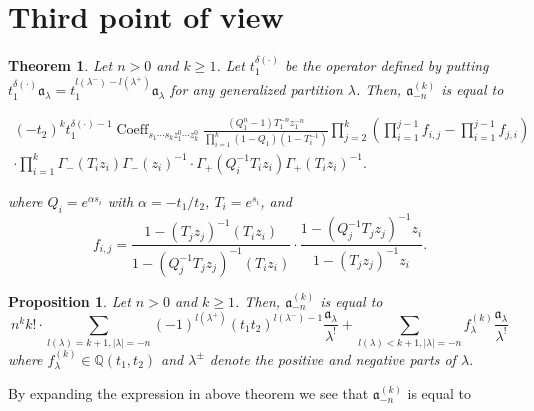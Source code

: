 \documentclass{article}
\newtheorem{theorem}{Theorem}[section]
\newtheorem{prop}{Proposition}[theorem]
\renewcommand{\frak}[1]{\mathfrak{#1}}
\newcommand{\lr}[1]{\left({#1}\right)}
\DeclareMathOperator{\Coeff}{Coeff}
\begin{document}
\section{Third point of view}
\begin{theorem}
Let $n>0$ and $k\geq1$. Let $t_1^{\delta(\cdot)}$ be the operator defined by putting $t_1^{\delta(\cdot)}\mathfrak{a}_\lambda = t_1^{l(\lambda^-)-l(\lambda^+)}\mathfrak{a}_\lambda$ for any generalized partition $\lambda$. Then, $\mathfrak{a}_{-n}^{(k)}$ is equal to

\begin{gather*}
(-t_2)^kt_1^{\delta(\cdot)-1}\Coeff_{s_1\cdots s_k z_1^{0}\cdots z_k^{0}}\frac{(Q_1^n-1)T_1^{-n}z_1^{-n}}{\prod_{i=1}^k(1-Q_1)(1-T_i^{-1})}\prod_{j=2}^k\lr{\prod_{i=1}^{j-1}f_{i,j} - \prod_{i=1}^{j-1}f_{j,i}}\\
\cdot\prod_{i=1}^k\Gamma_-(T_iz_i)\Gamma_-(z_i)^{-1}\cdot\Gamma_+(Q_i^{-1}T_iz_i)\Gamma_+(T_iz_i)^{-1}.
\end{gather*}

where $Q_i = e^{\alpha s_i}$ with $\alpha = -t_1/t_2$, $T_i = e^{s_i}$, and
\[
f_{i,j} = \frac{1-(T_jz_j)^{-1}(T_iz_i)}{1-(Q_j^{-1}T_jz_j)^{-1}(T_iz_i)} \cdot \frac{1-(Q_j^{-1}T_jz_j)^{-1}z_i}{1-(T_jz_j)^{-1}z_i}.
\]
\end{theorem}
\begin{prop}
Let $n>0$ and $k\geq 1$. Then, $\frak{a}_{-n}^{(k)}$ is equal to
\[
n^kk!\cdot\sum_{l(\lambda)=k+1, |\lambda|=-n} (-1)^{l(\lambda^+)}(t_1t_2)^{l(\lambda^{-})-1}\frac{\frak{a}_\lambda}{\lambda^!} + \sum_{l(\lambda)<k+1,|\lambda|=-n} f_\lambda^{(k)}\frac{\frak{a}_\lambda}{\lambda^!}
\]
where $f_\lambda^{(k)}\in\mathbb{Q}(t_1,t_2)$ and $\lambda^{\pm}$ denote the positive and negative parts of $\lambda$.
\end{prop}
By expanding the expression in above theorem we see that $\frak{a}_{-n}^{(k)}$ is equal to
\end{document}
